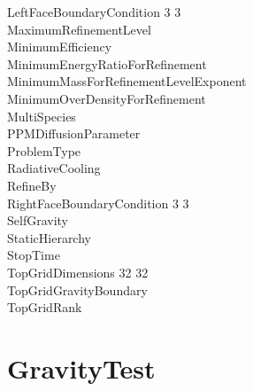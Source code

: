 \documentclass{book}
\begin{document}
{\begin{tabbing}
\> LeftFaceBoundaryCondition   3 3    \\
\> MaximumRefinementLevel         \\
\> MinimumEfficiency            \\
\> MinimumEnergyRatioForRefinement   \\
\> MinimumMassForRefinementLevelExponent  \\
\> MinimumOverDensityForRefinement   \\
\> MultiSpecies                 \\
\> PPMDiffusionParameter               \\
\> ProblemType                       \\
\> RadiativeCooling             \\
\> RefineBy                       \\
\> RightFaceBoundaryCondition  3 3 \\
\> SelfGravity                        \\
\> StaticHierarchy                \\
\> StopTime                \\
\> TopGridDimensions           32 32 \\
\> TopGridGravityBoundary             \\
\> TopGridRank                
\end{tabbing}}

\subsection{\cello}

\section{GravityTest} \label{s:GravityTest}

\subsection{\enzo}
\end{document}

